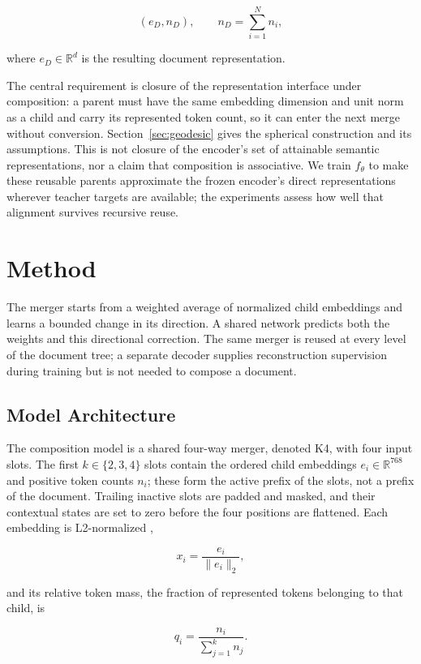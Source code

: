 \documentclass[10pt]{article}
\begin{document}
\[
(e_D,n_D),
\qquad
n_D=\sum_{i=1}^{N} n_i,
\]

where \(e_D \in \mathbb{R}^d\) is the resulting document representation.

The central requirement is closure of the representation interface under
composition: a parent must have the same embedding dimension and unit norm as
a child and carry its represented token count, so it can enter the next merge
without conversion. Section~\ref{sec:geodesic} gives the spherical construction
and its assumptions. This is not closure of the encoder's set of attainable
semantic representations, nor a claim that composition is associative.
We train \(f_\theta\) to make these reusable parents approximate the frozen
encoder's direct representations wherever teacher targets are available;
the experiments assess how well that alignment survives recursive reuse.

\section{Method}
\label{sec:method}

The merger starts from a weighted average of normalized child embeddings and
learns a bounded change in its direction. A shared network predicts both the
weights and this directional correction. The same merger is reused at every
level of the document tree; a separate decoder supplies reconstruction
supervision during training but is not needed to compose a document.

\subsection{Model Architecture}
\label{sec:model-architecture}

The composition model is a shared four-way merger, denoted K4, with four input slots. The first \(k\in\{2,3,4\}\) slots contain the ordered child embeddings \(e_i\in\mathbb{R}^{768}\) and positive token counts \(n_i\); these form the active prefix of the slots, not a prefix of the document. Trailing inactive slots are padded and masked, and their contextual states are set to zero before the four positions are flattened. Each embedding is L2-normalized \citep{meng-etal-2019-spherical},

\[
x_i=\frac{e_i}{\lVert e_i\rVert_2},
\]

and its relative token mass, the fraction of represented tokens belonging to that child, is

\[
q_i=\frac{n_i}{\sum_{j=1}^{k}n_j}.
\]
\end{document}
